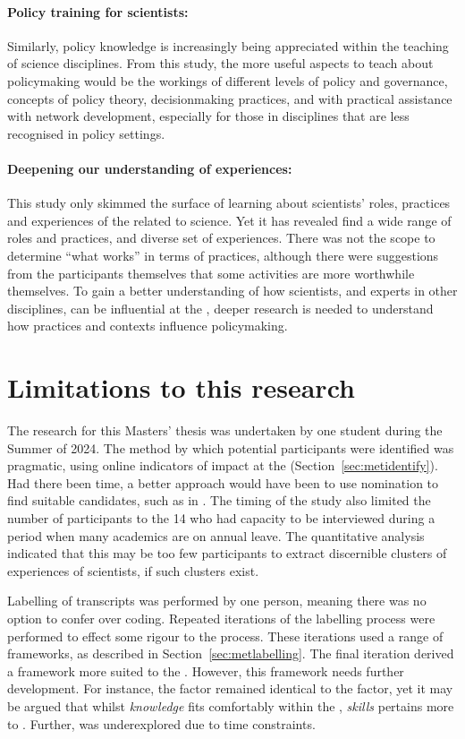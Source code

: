 \paragraph{Policy training for scientists:}
Similarly, policy knowledge is increasingly being appreciated within the teaching of science disciplines. From this study, the more useful aspects to teach about policymaking would be the workings of different levels of policy and governance, concepts of policy theory, decisionmaking practices, and with practical assistance with network development, especially for those in disciplines that are less recognised in policy settings. 

\paragraph{Deepening our understanding of experiences:}
This study only skimmed the surface of learning about scientists' roles, practices and experiences of the \SPI{} related to \CAN{} science. Yet it has revealed find a wide range of roles and practices, and diverse set of experiences. There was not the scope to determine ``what works'' in terms of practices, although there were suggestions from the participants themselves that some activities are more worthwhile themselves. To gain a better understanding of how scientists, and experts in other disciplines, can be influential at the \SPI, deeper research is needed to understand how practices and contexts influence policymaking.

\section{Limitations to this research}
The research for this Masters' thesis was undertaken by one student during the Summer of 2024. The method by which potential participants were identified was pragmatic, using online indicators of impact at the \SPI{} (Section~\ref{sec:metidentify}). Had there been time, a better approach would have been to use nomination to find suitable candidates, such as in \textcite{HaynesDCRHGS2011}. The timing of the study also limited the number of participants to the 14 who had capacity to be interviewed during a period when many academics are on annual leave. The quantitative analysis indicated that this may be too few participants to extract discernible clusters of experiences of scientists, if such clusters exist.

Labelling of transcripts was performed by one person, meaning there was no option to confer over coding. Repeated iterations of the labelling process were performed to effect some rigour to the process. These iterations used a range of frameworks, as described in Section~\ref{sec:metlabelling}. The final iteration derived a framework more suited to the \SPI. However, this framework needs further development. For instance, the \skiskil{} factor remained identical to the \ISM{} \ismis{} factor, yet it may be argued that whilst \emph{knowledge} fits comfortably within the \skiknow{}, \emph{skills} pertains more to \skiscip. Further, \skiemot{} was underexplored due to time constraints.


